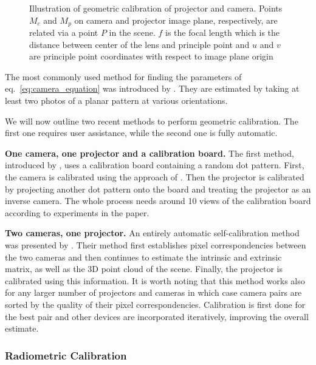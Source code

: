 \begin{figure}[ht]
    \centering
    \def\svgwidth{0.8\textwidth}
    
    \caption{Illustration of geometric calibration of projector and camera. Points \(M_c\) and \(M_p\) on camera and projector image plane, respectively, are related via a point \(P\) in the scene. \(f\) is the focal length which is the distance between center of the lens and principle point and \(u\) and \(v\) are principle point coordinates with respect to image plane origin}
    \label{fig:background_camera_calibration}
\end{figure}

The most commonly used method for finding the parameters of eq.~\ref{eq:camera_equation} was introduced by \citet{Zhang1999}. They are estimated by taking at least two photos of a planar pattern at various orientations.

We will now outline two recent methods to perform geometric calibration. The first one requires user assistance, while the second one is fully automatic.

\textbf{One camera, one projector and a calibration board.} The first method, introduced by \citet{Yang2016}, uses a calibration board containing a random dot pattern. First, the camera is calibrated using the approach of \citet{Zhang1999}. Then the projector is calibrated by projecting another dot pattern onto the board and treating the projector as an inverse camera. The whole process needs around 10 views of the calibration board according to experiments in the paper.

\textbf{Two cameras, one projector.} An entirely automatic self-calibration method was presented by \citet{Willi2017}. Their method first establishes pixel correspondencies between the two cameras and then continues to estimate the intrinsic and extrinsic matrix, as well as the 3D point cloud of the scene. Finally, the projector is calibrated using this information. It is worth noting that this method works also for any larger number of projectors and cameras in which case camera pairs are sorted by the quality of their pixel correspondencies. Calibration is first done for the best pair and other devices are incorporated iteratively, improving the overall estimate.

\subsubsection{Radiometric Calibration}
\label{section:background-projection_mapping-procams-radiometric_calibration}

